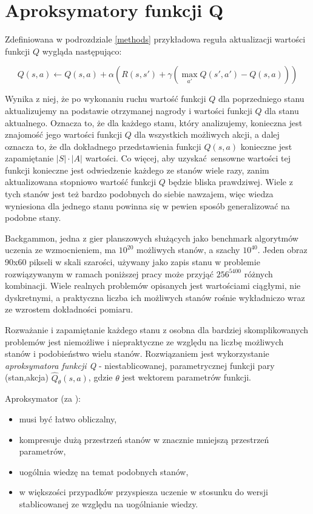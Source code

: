 \section{Aproksymatory funkcji Q}

Zdefiniowana w podrozdziale \ref{methods} przykładowa reguła aktualizacji wartości funkcji $Q$ wygląda następująco:

$$Q(s,a) \leftarrow Q(s,a) + \alpha (R(s,s') + \gamma (\max_{a'}Q(s',a') - Q (s,a)))$$

Wynika z niej, że po wykonaniu ruchu wartość funkcji $Q$ dla poprzedniego stanu aktualizujemy na podstawie otrzymanej nagrody i wartości funkcji $Q$ dla stanu aktualnego. Oznacza to, że dla każdego stanu, który analizujemy, konieczna jest znajomość jego wartości funkcji $Q$ dla wszystkich możliwych akcji, a dalej oznacza to, że dla dokładnego przedstawienia funkcji $Q(s,a)$  konieczne jest zapamiętanie $\left\vert{S}\right\vert \cdot \left\vert{A}\right\vert$ wartości. Co więcej, aby uzyskać sensowne wartości tej funkcji konieczne jest odwiedzenie każdego ze stanów wiele razy, zanim aktualizowana stopniowo wartość funkcji $Q$ będzie bliska prawdziwej. Wiele z tych stanów jest też bardzo podobnych do siebie nawzajem, więc wiedza wyniesiona dla jednego stanu powinna się w pewien sposób generalizować na podobne stany.

Backgammon, jedna z gier planszowych służących jako benchmark algorytmów uczenia ze wzmocnieniem, ma $10^{20}$ możliwych stanów, a szachy $10^{40}$. Jeden obraz 90x60 pikseli w skali szarości, używany jako zapis stanu w problemie rozwiązywanym w ramach poniższej pracy może przyjąć $256^{5400}$ różnych kombinacji. Wiele realnych problemów opisanych jest wartościami ciągłymi, nie dyskretnymi, a praktyczna liczba ich możliwych stanów rośnie wykładniczo wraz ze wzrostem dokładności pomiaru.

Rozważanie i zapamiętanie każdego stanu z osobna dla bardziej skomplikowanych problemów jest niemożliwe i niepraktyczne ze względu na liczbę możliwych stanów i podobieństwo wielu stanów. Rozwiązaniem jest wykorzystanie \textit {aproksymatora funkcji Q} - niestablicowanej, parametrycznej funkcji pary (stan,akcja) $\hat{Q}_{\theta}(s,a)$, gdzie $\theta$ jest wektorem parametrów funkcji.


Aproksymator (za \cite{wjaskowski2016}):
\begin{itemize}
\item musi być łatwo obliczalny,
\item kompresuje dużą przestrzeń stanów w znacznie mniejszą przestrzeń parametrów,
\item uogólnia wiedzę na temat podobnych stanów,
\item w większości przypadków przyspiesza uczenie w stosunku do wersji stablicowanej ze względu na uogólnianie wiedzy.
\end{itemize}

